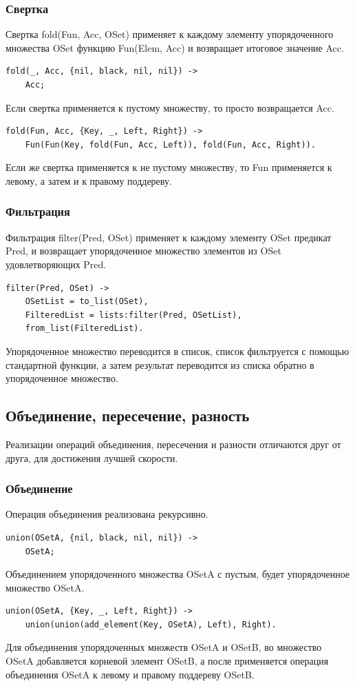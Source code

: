 		\subsubsection{Свертка}
			Свертка fold(Fun, Acc, OSet) применяет к каждому элементу упорядоченного
			множества OSet функцию Fun(Elem, Acc) и возвращает итоговое значение Acc.
			\begin{lstlisting}
fold(_, Acc, {nil, black, nil, nil}) ->
    Acc;	
			\end{lstlisting}
			Если свертка применяется к пустому множеству, то просто возвращается Acc.
			\begin{lstlisting}
fold(Fun, Acc, {Key, _, Left, Right}) ->
    Fun(Fun(Key, fold(Fun, Acc, Left)), fold(Fun, Acc, Right)).
			\end{lstlisting}
			Если же свертка применяется к не пустому множеству, то Fun применяется к левому, 
			а затем и к правому поддереву.
		
		\subsubsection{Фильтрация}
			Фильтрация filter(Pred, OSet) применяет к каждому элементу OSet предикат Pred, и 
			возвращает упорядоченное множество элементов из OSet удовлетворяющих Pred.
			\begin{lstlisting}
filter(Pred, OSet) ->
    OSetList = to_list(OSet),
    FilteredList = lists:filter(Pred, OSetList),
    from_list(FilteredList).	
			\end{lstlisting}
			Упорядоченное множество переводится в список, список фильтруется с помощью стандартной 
			функции, а затем результат переводится из списка обратно в упорядоченное множество.
			
			
	\subsection{Объединение, пересечение, разность}
		Реализации операций объединения, пересечения и разности отличаются друг от друга, для 
		достижения лучшей скорости.
		
		\subsubsection{Объединение}
			Операция объединения реализована рекурсивно. 
			\begin{lstlisting}			
union(OSetA, {nil, black, nil, nil}) ->
    OSetA;
			\end{lstlisting}
			Объединением упорядоченного множества OSetA с пустым, будет упорядоченное множество OSetA.
			\begin{lstlisting}
union(OSetA, {Key, _, Left, Right}) ->
    union(union(add_element(Key, OSetA), Left), Right).
			\end{lstlisting}
			Для объединения упорядоченных множеств OSetA и OSetB, во множество OSetA добавляется корневой 
			элемент OSetB, а после применяется операция объединения OSetA к левому и правому поддереву OSetB.  
		
